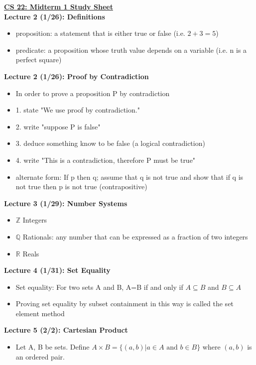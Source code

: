 \documentclass[twocolumn]{article}
\begin{document}
\textbf{\underline{CS 22: Midterm 1 Study Sheet}} \\

\textbf{Lecture 2 (1/26): Definitions}
\begin{itemize}
    \item proposition: a statement that is either true or false (i.e. $2+3 = 5$)
    \item predicate: a proposition whose truth value depends on a variable (i.e. n is a perfect square)
\end{itemize}

\textbf{Lecture 2 (1/26): Proof by Contradiction}
\begin{itemize}
    \item In order to prove a proposition P by contradiction
    \item 1. state "We use proof by contradiction."
    \item 2. write "suppose P is false"
    \item 3. deduce something know to be false (a logical contradiction)
    \item 4. write "This is a contradiction, therefore P must be true"
    \item alternate form: If p then q; assume that q is not true and show that if q is not true then p is not true (contrapositive)
\end{itemize}

\textbf{Lecture 3 (1/29): Number Systems}
\begin{itemize}
    \item $\mathbb{Z}$ Integers
    \item $\mathbb{Q}$ Rationals: any number that can be expressed as a fraction of two integers
    \item $\mathbb{R}$ Reals
\end{itemize}

\textbf{Lecture 4 (1/31): Set Equality}
\begin{itemize}
    \item Set equality: For two sets A and B, A=B if and only if $A \subseteq B$ and $B \subseteq A$
    \item Proving set equality by subset containment in this way is called the set element method
\end{itemize}

\textbf{Lecture 5 (2/2): Cartesian Product}
\begin{itemize}
    \item Let A, B be sets. Define $A \times B = \{ (a,b) | a \in A \text{ and } b \in B\}$ where $(a, b)$ is an ordered pair.
\end{itemize}
\end{document}
